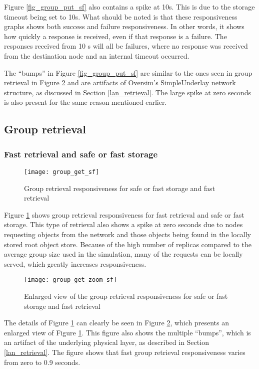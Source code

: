 Figure \ref{fig_group_put_sf} also contains a spike at 10s. This is due to the storage timeout being set to 10s. What should be noted is that these responsiveness graphs shows both success and failure responsiveness. In other words, it shows how quickly a response is received, even if that response is a failure. The responses received from 10 s will all be failures, where no response was received from the destination node and an internal timeout occurred.

The ``bumps'' in Figure \ref{fig_group_put_sf} are similar to the ones seen in group retrieval in Figure \ref{fig_group_get_zoom_sf} and are artifacts of Oversim's SimpleUnderlay network structure, as discussed in Section \ref{lan_retrieval}. The large spike at zero seconds is also present for the same reason mentioned earlier.

\subsection{Group retrieval}
\subsubsection{Fast retrieval and safe or fast storage}
\begin{figure}[htbp]
 \centering
 \texttt{[image: group\_get\_sf]}
 \caption{Group retrieval responsiveness for safe or fast storage and fast retrieval}
 \label{fig_group_get_sf}
\end{figure}
%
Figure \ref{fig_group_get_sf} shows group retrieval responsiveness for fast retrieval and safe or fast storage. This type of retrieval also shows a spike at zero seconds due to nodes requesting objects from the network and those objects being found in the locally stored root object store. Because of the high number of replicas compared to the average group size used in the simulation, many of the requests can be locally served, which greatly increases responsiveness.

\begin{figure}[htbp]
 \centering
 \texttt{[image: group\_get\_zoom\_sf]}
 \caption{Enlarged view of the group retrieval responsiveness for safe or fast storage and fast retrieval}
 \label{fig_group_get_zoom_sf}
\end{figure}
%
The details of Figure \ref{fig_group_get_sf} can clearly be seen in Figure \ref{fig_group_get_zoom_sf}, which presents an enlarged view of Figure \ref{fig_group_get_sf}. This figure also shows the multiple ``bumps'', which is an artifact of the underlying physical layer, as described in Section \ref{lan_retrieval}. The figure shows that fast group retrieval responsiveness varies from zero to 0.9 seconds.

